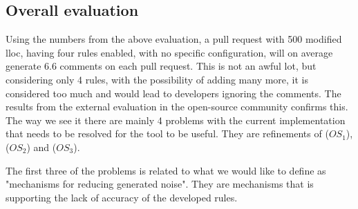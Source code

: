 \documentclass[pdftex,10pt,b5paper,twoside]{report}
\begin{document}

\subsection{Overall evaluation}
\label{evaluation-overall}

Using the numbers from the above evaluation, a pull request with 500 modified \gls{lloc}, having four rules enabled, with no specific configuration, will on average generate 6.6 comments on each pull request. This is not an awful lot, but considering only 4 rules, with the possibility of adding many more, it is considered too much and would lead to developers ignoring the comments. The results from the external evaluation in the open-source community confirms this. The way we see it there are mainly 4 problems with the current implementation that needs to be resolved for the tool to be useful. They are refinements of (\(OS_{1}\)), (\(OS_{2}\)) and (\(OS_{3}\)). 

The first three of the problems is related to what we would like to define as "mechanisms for reducing generated noise". They are mechanisms that is supporting the lack of accuracy of the developed rules.
\end{document}
